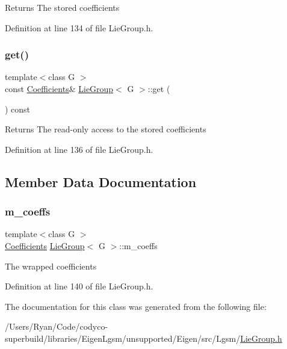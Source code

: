 \begin{DoxyReturn}{Returns}
The stored coefficients 
\end{DoxyReturn}


Definition at line 134 of file Lie\+Group.\+h.

\hypertarget{class_lie_group_aa551249eab20e2ba4778fc4753e09fd0}{}\label{class_lie_group_aa551249eab20e2ba4778fc4753e09fd0} 
\subsubsection{\texorpdfstring{get()}{get()}\hspace{0.1cm}{\footnotesize\ttfamily [2/2]}}
{\footnotesize\ttfamily template$<$class G $>$ \\
const \hyperlink{class_lie_group_a52de3c5adb933cbfa694b51bef656d5d}{Coefficients}\& \hyperlink{class_lie_group}{Lie\+Group}$<$ G $>$\+::get (\begin{DoxyParamCaption}{ }\end{DoxyParamCaption}) const\hspace{0.3cm}{\ttfamily [inline]}}

\begin{DoxyReturn}{Returns}
The read-\/only access to the stored coefficients 
\end{DoxyReturn}


Definition at line 136 of file Lie\+Group.\+h.



\subsection{Member Data Documentation}
\hypertarget{class_lie_group_a8a312c03fa7d4fed55b4c26d4fe3057a}{}\label{class_lie_group_a8a312c03fa7d4fed55b4c26d4fe3057a} 
\subsubsection{\texorpdfstring{m\+\_\+coeffs}{m\_coeffs}}
{\footnotesize\ttfamily template$<$class G $>$ \\
\hyperlink{class_lie_group_a52de3c5adb933cbfa694b51bef656d5d}{Coefficients} \hyperlink{class_lie_group}{Lie\+Group}$<$ G $>$\+::m\+\_\+coeffs\hspace{0.3cm}{\ttfamily [protected]}}

The wrapped coefficients 

Definition at line 140 of file Lie\+Group.\+h.



The documentation for this class was generated from the following file\+:\begin{DoxyCompactItemize}
\item 
/\+Users/\+Ryan/\+Code/codyco-\/superbuild/libraries/\+Eigen\+Lgsm/unsupported/\+Eigen/src/\+Lgsm/\hyperlink{_lie_group_8h}{Lie\+Group.\+h}\end{DoxyCompactItemize}
